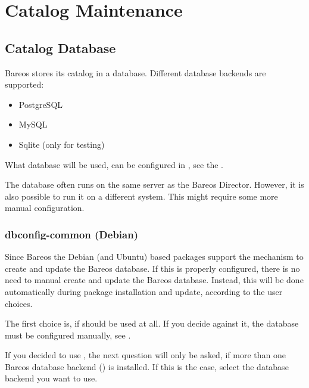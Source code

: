 
\chapter{Catalog Maintenance}
\label{CatMaintenanceChapter}

\section{Catalog Database}

Bareos stores its catalog in a database.
Different database backends are supported:
\begin{itemize}
    \item PostgreSQL
    \item MySQL
    \item Sqlite (only for testing)
\end{itemize}

What database will be used, can be configured in , see the .

The database often runs on the same server as the Bareos Director.
However, it is also possible to run it on a different system.
This might require some more manual configuration.



\subsection{dbconfig-common (Debian)}
\label{sec:dbconfig}

Since Bareos  the Debian (and Ubuntu) based packages support the  mechanism to create and update the Bareos database.
If this is properly configured, there is no need to manual create and update the Bareos database. 
Instead, this will be done automatically during package installation and update, according to the user choices.

The first choice is, if  should be used at all.
If you decide against it, the database must be configured manually, see .

If you decided to use , the next question will only be asked, if more than one
Bareos database backend () is installed.
If this is the case, select the database backend you want to use.

